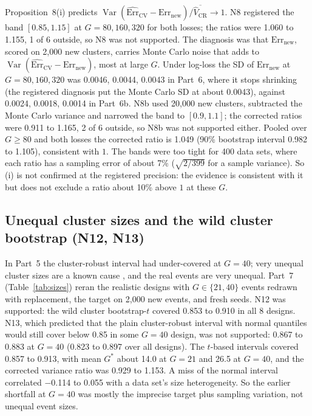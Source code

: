 \documentclass[11pt]{amsart}
\theoremstyle{plain}
\theoremstyle{definition}
\theoremstyle{remark}
\newcommand{\Var}{\operatorname{Var}}
\newcommand{\CV}{\widehat{\mathrm{Err}}_{\mathrm{CV}}}
\newcommand{\Errnew}{\mathrm{Err}_{\mathrm{new}}}
\newcommand{\VCR}{\hat V_{\mathrm{CR}}}
\begin{document}
Proposition~8(i) predicts $\Var(\CV-\Errnew)/\overline{\VCR}\to1$. N8 registered the band $[0.85,1.15]$ at $G=80,160,320$ for both losses; the ratios were 1.060 to 1.155, 1 of 6 outside, so N8 was not supported. The diagnosis was that $\Errnew$, scored on 2,000 new clusters, carries Monte Carlo noise that adds to $\Var(\CV-\Errnew)$, most at large $G$. Under log-loss the SD of $\Errnew$ at $G=80,160,320$ was 0.0046, 0.0044, 0.0043 in Part~6, where it stops shrinking (the registered diagnosis put the Monte Carlo SD at about 0.0043), against 0.0024, 0.0018, 0.0014 in Part~6b. N8b used 20,000 new clusters, subtracted the Monte Carlo variance and narrowed the band to $[0.9,1.1]$; the corrected ratios were 0.911 to 1.165, 2 of 6 outside, so N8b was not supported either. Pooled over $G\ge80$ and both losses the corrected ratio is 1.049 (90\% bootstrap interval 0.982 to 1.105), consistent with $1$. The bands were too tight for 400 data sets, where each ratio has a sampling error of about 7\% ($\sqrt{2/399}$ for a sample variance). So (i) is not confirmed at the registered precision: the evidence is consistent with it but does not exclude a ratio about 10\% above $1$ at these $G$.

\subsection{Unequal cluster sizes and the wild cluster bootstrap (N12, N13)}

In Part~5 the cluster-robust interval had under-covered at $G=40$; very unequal cluster sizes are a known cause \cite{MW}, and the real events are very unequal. Part~7 (Table~\ref{tab:sizes}) reran the realistic designs with $G\in\{21,40\}$ events redrawn with replacement, the target on 2,000 new events, and fresh seeds. N12 was supported: the wild cluster bootstrap-$t$ covered 0.853 to 0.910 in all 8 designs. N13, which predicted that the plain cluster-robust interval with normal quantiles would still cover below 0.85 in some $G=40$ design, was not supported: 0.867 to 0.883 at $G=40$ (0.823 to 0.897 over all designs). The $t$-based intervals covered 0.857 to 0.913, with mean $G^*$ about 14.0 at $G=21$ and 26.5 at $G=40$, and the corrected variance ratio was 0.929 to 1.153. A miss of the normal interval correlated $-$0.114 to 0.055 with a data set's size heterogeneity. So the earlier shortfall at $G=40$ was mostly the imprecise target plus sampling variation, not unequal event sizes.
\end{document}
